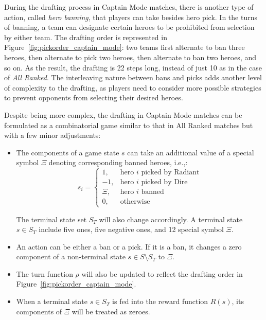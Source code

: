 During the drafting process in Captain Mode matches, there is another type of action, called \textit{hero banning}, that players can take besides hero pick. In the turns of banning, a team can designate certain heroes to be prohibited from selection by either team. The drafting order is represented in Figure~\ref{fig:pickorder_captain_mode}: two teams first alternate to ban three heroes, then alternate to pick two heroes, then alternate to ban two heroes, and so on. As the result, the drafting is 22 steps long, instead of just 10 as in the case of \textit{All Ranked}. The interleaving nature between bans and picks adds another level of complexity to the drafting, as players need to consider more possible strategies to prevent opponents from selecting their desired heroes. 

Despite being more complex, the drafting in Captain Mode matches can be formulated as a combinatorial game similar to that in All Ranked matches but with a few minor adjustments:

\begin{itemize}[leftmargin=*]
    \item The components of a game state $s$ can take an additional value of a special symbol $\Xi$ denoting corresponding banned heroes, i.e.,:
\begin{equation}
s_{i}=
\begin{cases}
  1, & \text{hero } i \text{ picked by Radiant} \\
  -1, & \text{hero } i \text{ picked by Dire} \\
  \Xi, & \text{hero }i \text{ banned} \\
  0, & \text{otherwise}
\end{cases}
\label{eqn:sifeature}
\end{equation}

The terminal state set $S_T$ will also change accordingly. A terminal state $s \in S_T$ include five ones, five negative ones, and 12 special symbol $\Xi$.

    \item An action can be either a ban or a pick. If it is a ban, it changes a zero component of a non-terminal state $s \in S \setminus S_T$ to $\Xi$. 
    \item The turn function $\rho$ will also be updated to reflect the drafting order in Figure~\ref{fig:pickorder_captain_mode}.
    \item When a terminal state $s \in S_T$ is fed into the reward function $R(s)$, its components of $\Xi$ will be treated as zeroes.
\end{itemize}

